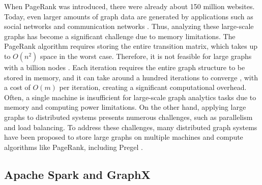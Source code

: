 When PageRank was introduced, there were already about 150 million websites. Today, even larger amounts of graph data are generated by applications such as social networks and communication networks \cite{gebreegziabher_chapter_2023}. Thus, analyzing these large-scale graphs has become a significant challenge due to memory limitations. The PageRank algorithm requires storing the entire transition matrix, which takes up to $O(n^2)$ space in the worst case. Therefore, it is not feasible for large graphs with a billion nodes \cite{wu_efficient_2024}. Each iteration requires the entire graph structure to be stored in memory, and it can take around a hundred iterations to converge \cite{langville_googles_2012}, with a cost of $O(m)$ per iteration, creating a significant computational overhead. Often, a single machine is insufficient for large-scale graph analytics tasks due to memory and computing power limitations. On the other hand, applying large graphs to distributed systems presents numerous challenges, such as parallelism and load balancing. To address these challenges, many distributed graph systems have been proposed to store large graphs on multiple machines and compute algorithms like PageRank, including Pregel \cite{meng_survey_2024}.



\subsection{Apache Spark and GraphX}


